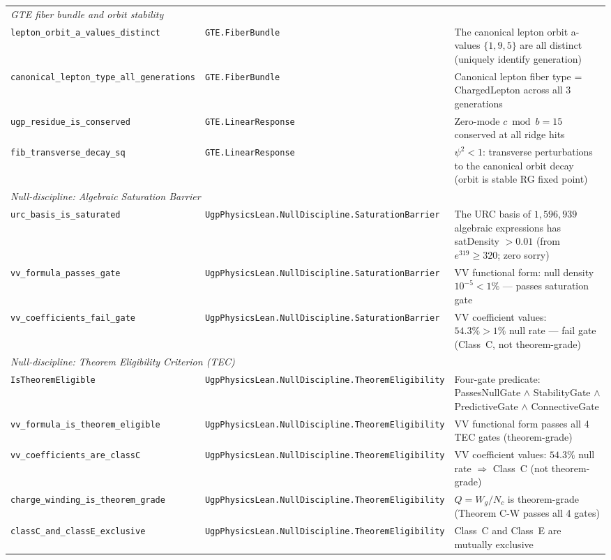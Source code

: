 \documentclass[10pt]{article}
\begin{document}
\begin{longtable}{@{} p{3.8cm} p{4.8cm} p{4.8cm} @{}}
\multicolumn{3}{l}{\textit{GTE fiber bundle and orbit stability}} \\[2pt]
\nolinkurl{lepton_orbit_a_values_distinct} & \nolinkurl{GTE.FiberBundle} & The canonical lepton orbit a-values $\{1,9,5\}$ are all distinct (uniquely identify generation) \\
\nolinkurl{canonical_lepton_type_all_generations} & \nolinkurl{GTE.FiberBundle} & Canonical lepton fiber type = ChargedLepton across all 3 generations \\
\nolinkurl{ugp_residue_is_conserved} & \nolinkurl{GTE.LinearResponse} & Zero-mode $c \bmod b = 15$ conserved at all ridge hits \\
\nolinkurl{fib_transverse_decay_sq} & \nolinkurl{GTE.LinearResponse} & $\psi^2 < 1$: transverse perturbations to the canonical orbit decay (orbit is stable RG fixed point) \\[4pt]

\multicolumn{3}{l}{\textit{Null-discipline: Algebraic Saturation Barrier}} \\[2pt]
\nolinkurl{urc_basis_is_saturated} & \nolinkurl{UgpPhysicsLean.NullDiscipline.SaturationBarrier} & The URC basis of $1{,}596{,}939$ algebraic expressions has satDensity $> 0.01$ (from $e^{319} \ge 320$; zero sorry) \\
\nolinkurl{vv_formula_passes_gate} & \nolinkurl{UgpPhysicsLean.NullDiscipline.SaturationBarrier} & VV functional form: null density $10^{-5} < 1\%$ — passes saturation gate \\
\nolinkurl{vv_coefficients_fail_gate} & \nolinkurl{UgpPhysicsLean.NullDiscipline.SaturationBarrier} & VV coefficient values: $54.3\% > 1\%$ null rate — fail gate (Class~C, not theorem-grade) \\[4pt]

\multicolumn{3}{l}{\textit{Null-discipline: Theorem Eligibility Criterion (TEC)}} \\[2pt]
\nolinkurl{IsTheoremEligible} & \nolinkurl{UgpPhysicsLean.NullDiscipline.TheoremEligibility} & Four-gate predicate: PassesNullGate $\wedge$ StabilityGate $\wedge$ PredictiveGate $\wedge$ ConnectiveGate \\
\nolinkurl{vv_formula_is_theorem_eligible} & \nolinkurl{UgpPhysicsLean.NullDiscipline.TheoremEligibility} & VV functional form passes all 4 TEC gates (theorem-grade) \\
\nolinkurl{vv_coefficients_are_classC} & \nolinkurl{UgpPhysicsLean.NullDiscipline.TheoremEligibility} & VV coefficient values: $54.3\%$ null rate $\Rightarrow$ Class~C (not theorem-grade) \\
\nolinkurl{charge_winding_is_theorem_grade} & \nolinkurl{UgpPhysicsLean.NullDiscipline.TheoremEligibility} & $Q = W_g/N_c$ is theorem-grade (Theorem C-W passes all 4 gates) \\
\nolinkurl{classC_and_classE_exclusive} & \nolinkurl{UgpPhysicsLean.NullDiscipline.TheoremEligibility} & Class~C and Class~E are mutually exclusive \\[4pt]


\end{longtable}
\end{document}
